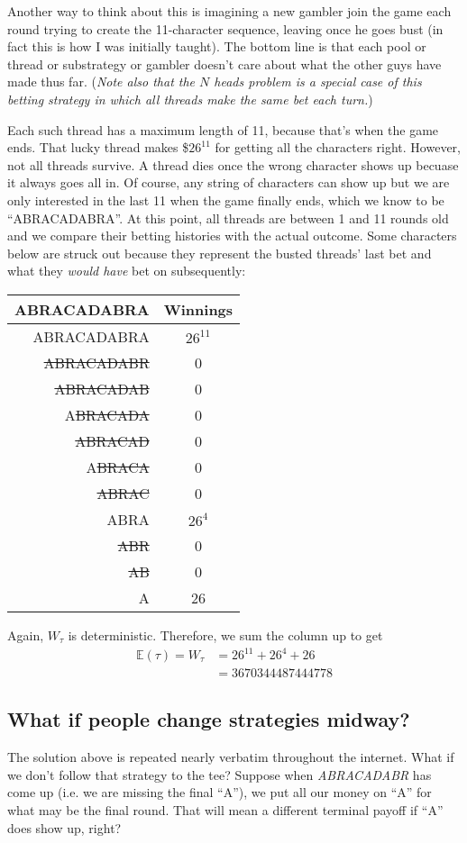 \documentclass[11pt]{article}
\newcommand{\E}{\mathbb{E}}
\begin{document}
Another way to think about this is imagining a new gambler join the game each round trying to create the 11-character sequence, leaving once he goes bust (in fact this is how I was initially taught). The bottom line is that each pool or thread or substrategy or gambler doesn't care about what the other guys have made thus far. 
(\textit{Note also that the $N$ heads problem is a special case of this betting strategy in which all threads make the same bet each turn.})

Each such thread has a maximum length of 11, because that's when the game ends. That lucky thread makes \$$26^{11}$ for getting all the characters right. However, not all threads survive. A thread dies once the wrong character shows up becuase it always goes all in. Of course, any string of characters can show up but we are only interested in the last 11 when the game finally ends, which we know to be ``ABRACADABRA''. At this point, all threads are between 1 and 11 rounds old and we compare their betting histories with the actual outcome. Some characters below are struck out because they represent the busted threads' last bet and what they \emph{would have} bet on subsequently:
\begin{center}
  \begin{tabular}{ |r|c| } 
   \hline
   ABRACADABRA & Winnings \\ \hline 
   ABRACADABRA & $26^{11}$\\ 
   \sout{ABRACADABR} & 0 \\ 
   \sout{ABRACADAB} & 0 \\ 
   A\sout{BRACADA} & 0 \\
   \sout{ABRACAD} & 0 \\
   A\sout{BRACA} & 0\\
   \sout{ABRAC} & 0 \\
   ABRA & $26^4$ \\
   \sout{ABR} & 0 \\
   \sout{AB} & 0 \\
   A & 26 \\ \hline
  \end{tabular}
\end{center}
Again, $W_\tau$ is deterministic. Therefore, we sum the column up to get 
\begin{align*}
\E(\tau) = W_\tau &= 26^{11} + 26^4 + 26 \\
&= \boxed{3670344487444778}
\end{align*}

\subsection{What if people change strategies midway?}
The solution above is repeated nearly verbatim throughout the internet. What if we don't follow that strategy to the tee? Suppose when \textit{ABRACADABR} has come up (i.e. we are missing the final ``A''), we put all our money on ``A'' for what may be the final round. That will mean a different terminal payoff if ``A'' does show up, right?
\end{document}
